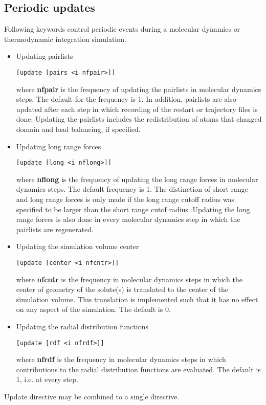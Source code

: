 \subsection{Periodic updates}
Following keywords control periodic events during a molecular
dynamics or thermodynamic integration simulation.
\begin{itemize}
\item
Updating pairlists
\begin{verbatim}
[update [pairs <i nfpair>]]
\end{verbatim}
where {\bf nfpair} is the frequency of updating the pairlists in
molecular dynamics steps. The default for the frequency is 1.
In addition, pairlists are also updated after each step in which
recording of the restart or trajectory files is done. Updating
the pairlists includes the redistribution of atoms that changed
domain and load balancing, if specified.
\item
Updating long range forces
\begin{verbatim}
[update [long <i nflong>]]
\end{verbatim}
where {\bf nflong} is the frequency of updating the long range
forces in molecular dynamics steps. The default frequency is 1.
The distinction of short range and long range forces is only
made if the long range cutoff radius was specified to be larger
than the short range cutof radius. Updating the long range forces
is also done in every molecular dynamics step in which the
pairlists are regenerated.
\item
Updating the simulation volume center
\begin{verbatim}
[update [center <i nfcntr>]]
\end{verbatim}
where {\bf nfcntr} is the frequency in molecular dynamics steps in 
which the center of geometry of the solute(s) is translated to the
center of the simulation volume. This translation is implemented
such that it has no effect on any aspect of the simulation. The
default is 0.
\item
Updating the radial distribution functions
\begin{verbatim}
[update [rdf <i nfrdf>]]
\end{verbatim}
where {\bf nfrdf} is the frequency in molecular dynamics steps in 
which contributions to the radial distribution functions are
evaluated. The default is 1, i.e. at every step.
\end{itemize}
Update directive may be combined to a single directive.
